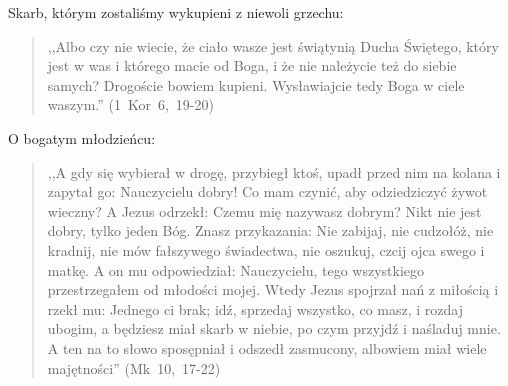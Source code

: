 \documentclass[10pt,a4paper,oneside]{article}
\begin{document}
Skarb, którym zostaliśmy wykupieni z niewoli grzechu:
\begin{quote}
,,Albo czy nie wiecie, że ciało wasze jest świątynią Ducha Świętego, który jest w was i którego macie od Boga, i że nie należycie też do siebie samych? Drogoście bowiem kupieni. Wysławiajcie tedy Boga w ciele waszym.'' (1~Kor~6,~19-20)
\end{quote}

O bogatym młodzieńcu:
\begin{quote}
,,A gdy się wybierał w drogę, przybiegł ktoś, upadł przed nim na kolana i zapytał go: Nauczycielu dobry! Co mam czynić, aby odziedziczyć żywot wieczny? A Jezus odrzekł: Czemu mię nazywasz dobrym? Nikt nie jest dobry, tylko jeden Bóg. Znasz przykazania: Nie zabijaj, nie cudzołóż, nie kradnij, nie mów fałszywego świadectwa, nie oszukuj, czcij ojca swego i matkę. A on mu odpowiedział: Nauczycielu, tego wszystkiego przestrzegałem od młodości mojej. Wtedy Jezus spojrzał nań z miłością i rzekł mu: Jednego ci brak; idź, sprzedaj wszystko, co masz, i rozdaj ubogim, a będziesz miał skarb w niebie, po czym przyjdź i naśladuj mnie. A ten na to słowo sposępniał i odszedł zasmucony, albowiem miał wiele majętności'' (Mk~10,~17-22)
\end{quote}
\end{document}
